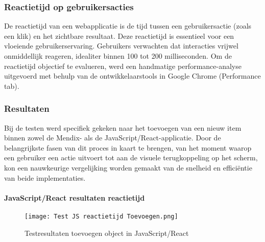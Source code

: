 \subsubsection{Reactietijd op gebruikersacties}
De reactietijd van een webapplicatie is de tijd tussen een gebruikersactie (zoals een klik) en het zichtbare resultaat. Deze reactietijd is essentieel voor een vloeiende gebruikerservaring. Gebruikers verwachten dat interacties vrijwel onmiddellijk reageren, idealiter binnen 100 tot 200 milliseconden. Om de reactietijd objectief te evalueren, werd een handmatige performance-analyse uitgevoerd met behulp van de ontwikkelaarstools in Google Chrome (Performance tab). 

\subsubsection{Resultaten}
Bij de testen werd specifiek gekeken naar het toevoegen van een nieuw item binnen zowel de Mendix- als de JavaScript/React-applicatie. Door de belangrijkste fasen van dit proces in kaart te brengen, van het moment waarop een gebruiker een actie uitvoert tot aan de visuele terugkoppeling op het scherm, kon een nauwkeurige vergelijking worden gemaakt van de snelheid en efficiëntie van beide implementaties.

\paragraph{JavaScript/React resultaten reactietijd}

\begin{figure}[H]
    \centering
    \texttt{[image: Test JS reactietijd Toevoegen.png]}
    \caption[Testresultaten toevoegen object in JavaScript/React]{\label{fig:reactietijd-JavaScript} Testresultaten toevoegen object in JavaScript/React }
\end{figure}



